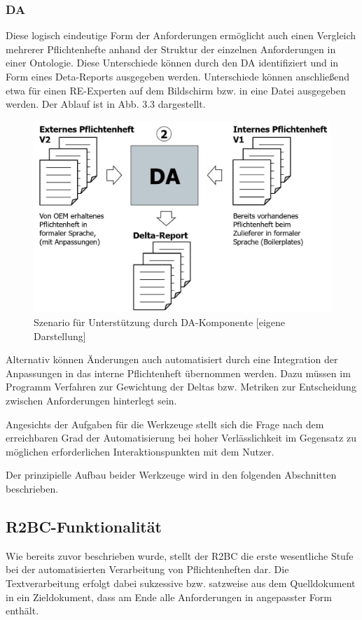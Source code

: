\documentclass[12pt]{report}
\begin{document}
\subsubsection{DA}
Diese logisch eindeutige Form der Anforderungen ermöglicht auch einen Vergleich mehrerer Pflichtenhefte anhand der Struktur der einzelnen Anforderungen in einer Ontologie. Diese Unterschiede können durch den DA identifiziert und in Form eines Deta-Reports ausgegeben werden. Unterschiede können anschließend etwa für einen RE-Experten auf dem Bildschirm bzw. in eine Datei ausgegeben werden. Der Ablauf ist in Abb. 3.3 dargestellt.
\begin{figure}[h!]
\begin{center}
\includegraphics[scale=0.5]{Bilder/Prozess-DA.jpg}
\caption{Szenario für Unterstützung durch DA-Komponente [eigene Darstellung]}
\end{center}
\end{figure}

Alternativ können Änderungen auch automatisiert durch eine Integration der Anpassungen in das interne Pflichtenheft übernommen werden. Dazu müssen im Programm Verfahren zur Gewichtung der Deltas bzw. Metriken zur Entscheidung zwischen Anforderungen hinterlegt sein.

Angesichts der Aufgaben für die Werkzeuge stellt sich die Frage nach dem erreichbaren Grad der Automatisierung bei hoher Verlässlichkeit im Gegensatz zu möglichen erforderlichen Interaktionspunkten mit dem Nutzer. 

Der prinzipielle Aufbau beider Werkzeuge wird in den folgenden Abschnitten beschrieben.

\subsection{R2BC-Funktionalität}
Wie bereits zuvor beschrieben wurde, stellt der R2BC die erste wesentliche Stufe bei der automatisierten Verarbeitung von Pflichtenheften dar. Die Textverarbeitung erfolgt dabei sukzessive bzw. satzweise aus dem Quelldokument in ein Zieldokument, dass am Ende alle Anforderungen in angepasster Form enthält. 
\end{document}
